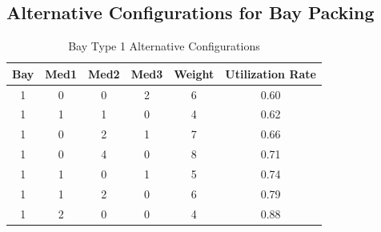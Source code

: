 \documentclass{mcmthesis}
\begin{document}



\newpage

\begin{appendices}

\section{Alternative Configurations for Bay Packing}\label{App:alte}


\begin{table}[htbp]
  \centering
  \caption{Bay Type 1 Alternative Configurations}
    \begin{tabular}{c|c|c|c|c|c}
\hline
    \multicolumn{1}{l}{Bay} & \multicolumn{1}{l}{Med1} & \multicolumn{1}{l}{Med2} & \multicolumn{1}{l}{Med3} & \multicolumn{1}{l}{Weight} & \multicolumn{1}{l}{Utilization Rate} \\
\hline
    1     & 0     & 0     & 2     & 6     & 0.60 \\
    1     & 1     & 1     & 0     & 4     & 0.62 \\
    1     & 0     & 2     & 1     & 7     & 0.66 \\
    1     & 0     & 4     & 0     & 8     & 0.71 \\
    1     & 1     & 0     & 1     & 5     & 0.74 \\
    1     & 1     & 2     & 0     & 6     & 0.79 \\
    1     & 2     & 0     & 0     & 4     & 0.88 \\
\hline
    \end{tabular}%
\end{table}%


\end{appendices}
\end{document}
